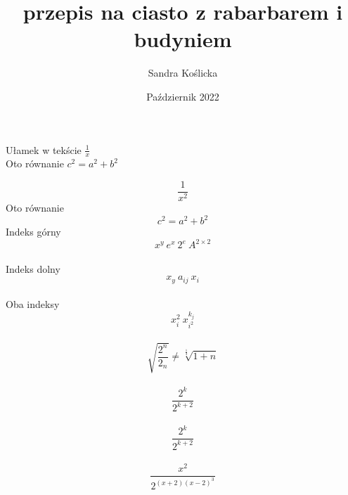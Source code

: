 \documentclass[12pt, letterpaper, titlepage]{article}
\title{przepis na ciasto z rabarbarem i budyniem}
\author{Sandra Koślicka}
\date{Październik 2022}
\begin{document}
\maketitle

Ułamek w tekście $ \frac{1}{x} $\\
Oto równanie $ c^{2}=a^{2}+b^{2} $

\begin{equation}
\frac{1}{x^2}
\end{equation}
Oto równanie
\begin{equation}
c^{2}=a^{2}+b^{2}
\end{equation}
Indeks górny $$ x^{y} \ e^{x} \ 2^{e} \ A^{2 \times2} $$\\
Indeks dolny $$ x_y \ a_{ij} \ x_i $$\\
Oba indeksy $$ x_i^{2} \ x_{i^2}^{k_j}$$\\

$$\sqrt{ \frac{2^{n}}{2_n}} \neq \sqrt[\frac{1}{3}]{1+n} $$\\
$$\frac{2^{k}}{2^{k+2}} $$\\

$$\frac{2^{k}}{2^{k+2}} $$\\

$$\frac{x^2}{2^{(x+2)(x-2)^{3}}} $$\\
\end{document}
